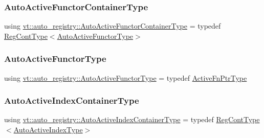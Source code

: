 \mbox{\label{namespacevt_1_1auto__registry_abe0cefefe73cf87e520a5ab3ebc88f4a}} 
\subsubsection{\texorpdfstring{Auto\+Active\+Functor\+Container\+Type}{AutoActiveFunctorContainerType}}
{\footnotesize\ttfamily using \hyperlink{namespacevt_1_1auto__registry_abe0cefefe73cf87e520a5ab3ebc88f4a}{vt\+::auto\+\_\+registry\+::\+Auto\+Active\+Functor\+Container\+Type} = typedef \hyperlink{namespacevt_1_1auto__registry_a988a4943e4c8fe82b56f5b13bddceb2b}{Reg\+Cont\+Type}$<$\hyperlink{namespacevt_1_1auto__registry_a0efe8e4e502d6a88a8eb50d7d909228d}{Auto\+Active\+Functor\+Type}$>$}

\mbox{\label{namespacevt_1_1auto__registry_a0efe8e4e502d6a88a8eb50d7d909228d}} 
\subsubsection{\texorpdfstring{Auto\+Active\+Functor\+Type}{AutoActiveFunctorType}}
{\footnotesize\ttfamily using \hyperlink{namespacevt_1_1auto__registry_a0efe8e4e502d6a88a8eb50d7d909228d}{vt\+::auto\+\_\+registry\+::\+Auto\+Active\+Functor\+Type} = typedef \hyperlink{namespacevt_a70e19bd64d031e65083c2125b2c65426}{Active\+Fn\+Ptr\+Type}}

\mbox{\label{namespacevt_1_1auto__registry_a892918ae7bc486701964f7e5e0bb0c8a}} 
\subsubsection{\texorpdfstring{Auto\+Active\+Index\+Container\+Type}{AutoActiveIndexContainerType}}
{\footnotesize\ttfamily using \hyperlink{namespacevt_1_1auto__registry_a892918ae7bc486701964f7e5e0bb0c8a}{vt\+::auto\+\_\+registry\+::\+Auto\+Active\+Index\+Container\+Type} = typedef \hyperlink{namespacevt_1_1auto__registry_a988a4943e4c8fe82b56f5b13bddceb2b}{Reg\+Cont\+Type}$<$\hyperlink{namespacevt_1_1auto__registry_ad5ff1c3344b954a1e1212c72c74e4a7a}{Auto\+Active\+Index\+Type}$>$}


